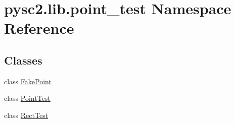 \hypertarget{namespacepysc2_1_1lib_1_1point__test}{}\section{pysc2.\+lib.\+point\+\_\+test Namespace Reference}
\label{namespacepysc2_1_1lib_1_1point__test}
\subsection*{Classes}
\begin{DoxyCompactItemize}
\item 
class \mbox{\hyperlink{classpysc2_1_1lib_1_1point__test_1_1_fake_point}{Fake\+Point}}
\item 
class \mbox{\hyperlink{classpysc2_1_1lib_1_1point__test_1_1_point_test}{Point\+Test}}
\item 
class \mbox{\hyperlink{classpysc2_1_1lib_1_1point__test_1_1_rect_test}{Rect\+Test}}
\end{DoxyCompactItemize}
